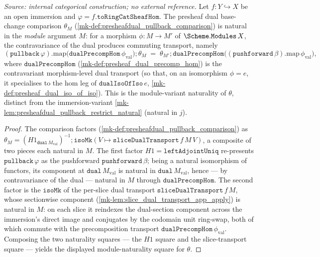 \begin{lemma}\label{mk-lem:presheafdual_pullback_comparison_natural_module}
  \leanok

  \textit{Source: internal categorical construction; no external reference.}
  Let \(f : Y \hookrightarrow X\) be an open immersion and \(\varphi = f.\mathtt{toRingCatSheafHom}\).
  The presheaf dual base-change comparison \(\theta_M\)
  (\ref{mk-def:presheafdual_pullback_comparison}) is natural in the \emph{module} argument \(M\):
  for a morphism \(\phi : M \to M'\) of \(\Scheme.\mathtt{Modules}\,X\), the contravariance of the dual
  produces commuting transport, namely
  \[
    (\mathtt{pullback}\,\varphi).\mathrm{map}\bigl(\mathtt{dualPrecompHom}\,\phi_{\mathrm{val}}\bigr)
      \mathbin{;} \theta_M
    \;=\; \theta_{M'} \mathbin{;}
      \mathtt{dualPrecompHom}\bigl((\mathtt{pushforward}\,\beta).\mathrm{map}\,\phi_{\mathrm{val}}\bigr),
  \]
  where \(\mathtt{dualPrecompHom}\) (\ref{mk-def:presheaf_dual_precomp_hom}) is the contravariant
  morphism-level dual transport (so that, on an isomorphism \(\phi = e\), it specialises to the
  \(\mathrm{hom}\) leg of \(\mathtt{dualIsoOfIso}\,e\), \ref{mk-def:presheaf_dual_iso_of_iso}). This is
  the module-variant naturality of \(\theta\), distinct from the immersion-variant
  \ref{mk-lem:presheafdual_pullback_restrict_natural} (natural in \(j\)).
\end{lemma}
\begin{proof}
  \leanok
  The comparison factors (\ref{mk-def:presheafdual_pullback_comparison}) as
  \(\theta_M = (H1_{\mathtt{dual}\,M_{\mathrm{val}}})^{-1} \mathbin{;}
    \mathtt{isoMk}(V \mapsto \mathtt{sliceDualTransport}\,f\,M\,V)\), a composite of two pieces each
  natural in \(M\). The first factor \(H1 = \mathtt{leftAdjointUniq}\) re-presents
  \(\mathtt{pullback}\,\varphi\) as the pushforward \(\mathtt{pushforward}\,\beta\); being a natural
  isomorphism of functors, its component at \(\mathtt{dual}\,M_{\mathrm{val}}\) is natural in
  \(\mathtt{dual}\,M_{\mathrm{val}}\), hence --- by contravariance of the dual --- natural in \(M\)
  through \(\mathtt{dualPrecompHom}\). The second factor is the \(\mathtt{isoMk}\) of the per-slice
  dual transport \(\mathtt{sliceDualTransport}\,f\,M\), whose sectionwise component
  (\ref{mk-lem:slice_dual_transport_app_apply}) is natural in \(M\): on each slice it reindexes the
  dual-section component across the immersion's direct image and conjugates by the codomain unit
  ring-swap, both of which commute with the precomposition transport
  \(\mathtt{dualPrecompHom}\,\phi_{\mathrm{val}}\). Composing the two naturality squares --- the
  \(H1\) square and the slice-transport square --- yields the displayed module-naturality square for
  \(\theta\).
\end{proof}

